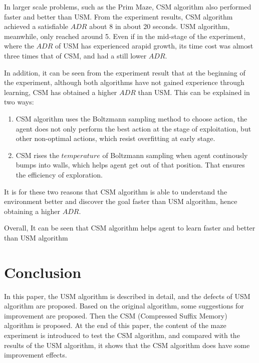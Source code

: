 \documentclass{article}
\begin{document}
In larger scale problems, such as the Prim Maze, CSM algorithm also performed
faster and better than USM. From the experiment results, CSM algorithm achieved a satisfiable
$ADR$ about 8 in about 20 seconds. USM algorithm, meanwhile, only reached around 5.
Even if in the mid-stage of the experiment, where the $ADR$ of USM has experienced arapid growth,
its time cost was almost three times that of CSM, and had a still lower $ADR$.

In addition, it can be seen from the experiment result that at the beginning of the experiment,
although both algorithms have not gained experience through learning, CSM has obtained a higher
$ADR$ than USM. This can be explained in two ways:
\begin{enumerate}
  \item CSM algorithm uses the Boltzmann sampling method to choose action, the agent does
  not only perform the best action at the stage of exploitation, but  other non-optimal actions,
  which resist overfitting at early stage.
  
  \item CSM rises the $temperature$ of Boltzmann sampling when agent continously bumps into walls,
  which helps agent get out of that position. That ensures the efficiency of exploration.
  
\end{enumerate}
It is for these two reasons that CSM algorithm is able to understand the environment better and
discover the goal faster than USM algorithm, hence obtaining a higher $ADR$.

Overall, It can be seen that CSM algorithm helps agent to learn faster and better than USM algorithm


\section{Conclusion}

In this paper, the USM algorithm is described in detail, and the defects of USM
algorithm are proposed. Based on the original algorithm, some suggestions for improvement
are proposed. Then the CSM (Compressed Suffix Memory) algorithm is proposed. At the end of
this paper, the content of the maze experiment is introduced to test the CSM algorithm, and
compared with the results of the USM algorithm, it shows that the CSM algorithm does have
some improvement effects.


\clearpage
\small


\end{document}
